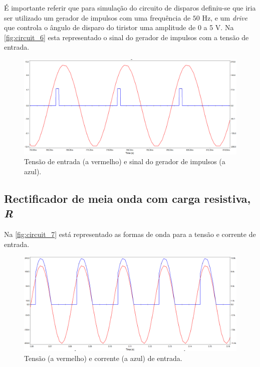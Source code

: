 \documentclass[a4paper,11pt]{article}
\numberwithin{equation}{section}
\begin{document}
É importante referir que para simulação do circuito de disparos definiu-se que iria ser utilizado um gerador de impulsos com uma frequência   de $50$ Hz, e um \textit{drive} que controla o ângulo de disparo do tiristor uma amplitude de 0 a 5 V. Na \autoref{fig:circuit_6} esta representado o sinal do gerador de impulsos com a tensão de entrada.

\begin{figure}[h]
	\centering
	\includegraphics[keepaspectratio=true, scale=0.35]{img/circuito4}
	\caption{Tensão de entrada (a vermelho) e sinal do gerador de impulsos (a azul).}
	\label{fig:circuit_6}
	\vspace{-0.8em}
\end{figure}

\pagebreak
\subsection{Rectificador de meia onda com carga resistiva, \textit{R}}

	Na \autoref{fig:circuit_7}  está representado as formas de onda para a tensão e corrente de entrada.

\begin{figure}[h]
	\centering
	\includegraphics[keepaspectratio=true, scale=0.3]{img/circuito5}
	\caption{Tensão (a vermelho) e corrente (a azul) de entrada.}
	\label{fig:circuit_7}
	\vspace{-0.8em}
\end{figure}
\end{document}
